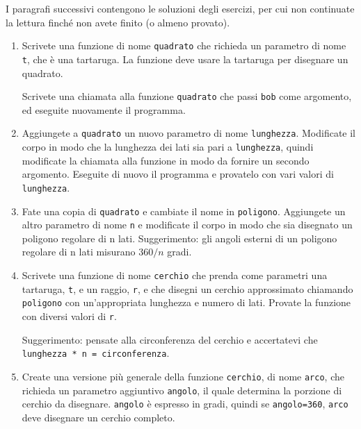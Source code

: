 \documentclass[10pt]{book}
\begin{document}
I paragrafi successivi contengono le soluzioni degli esercizi, per cui non continuate la lettura finché non avete finito (o almeno provato).

\begin{enumerate}

\item Scrivete una funzione di nome {\tt quadrato} che richieda un parametro di nome {\tt t}, che è una tartaruga. La funzione deve usare la tartaruga per disegnare un quadrato.

Scrivete una chiamata alla funzione {\tt quadrato} che passi {\tt bob} come argomento, ed eseguite nuovamente il programma.

\item Aggiungete a {\tt quadrato} un nuovo parametro di nome {\tt lunghezza}.
Modificate il corpo in modo che la lunghezza dei lati sia pari a {\tt lunghezza}, quindi modificate la chiamata alla funzione in modo da fornire un secondo argomento. Eseguite di nuovo il programma e provatelo con vari valori di {\tt
lunghezza}.

\item Fate una copia di {\tt quadrato} e cambiate il nome in {\tt poligono}.  Aggiungete un altro parametro di nome {\tt n} e modificate il corpo in modo che sia disegnato un poligono regolare di n lati. Suggerimento: gli angoli esterni di un poligono regolare di n lati misurano $360/n$ gradi.

\item Scrivete una funzione di nome {\tt cerchio} che prenda come parametri una tartaruga, {\tt t}, e un raggio, {\tt r}, e che disegni un cerchio approssimato chiamando {\tt poligono} con un'appropriata lunghezza e numero di lati. Provate la funzione con diversi valori di {\tt r}.

Suggerimento: pensate alla circonferenza del cerchio e accertatevi che
{\tt lunghezza * n = circonferenza}.

\item Create una versione più generale della funzione {\tt cerchio}, di nome {\tt arco}, che richieda un parametro aggiuntivo {\tt angolo}, il quale determina la porzione di cerchio da disegnare.  {\tt angolo} è espresso in gradi, quindi se {\tt angolo=360}, {\tt arco} deve disegnare un cerchio completo.

\end{enumerate}
\end{document}

